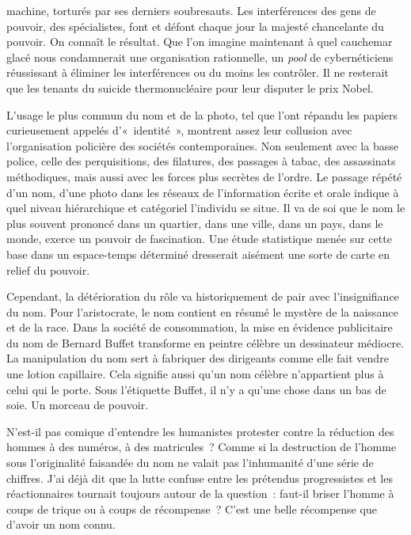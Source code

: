 \documentclass[french,twoside]{book} %
\newcommand{\astermono}{\medskip\centerline{\color{rubric}\large\selectfont{\syms ✻}}\medskip\par}%
\begin{document}
machine, torturés par ses derniers soubresauts. Les interférences des gens de pouvoir, des spécialistes, font et défont chaque jour la majesté chancelante du pouvoir. On connaît le résultat. Que l’on imagine maintenant à quel cauchemar glacé nous condamnerait une organisation rationnelle, un \emph{pool} de cybernéticiens réussissant à éliminer les interférences ou du moins les contrôler. Il ne resterait que les tenants du suicide thermonucléaire pour leur disputer le prix Nobel.\par

\astermono

\noindent L’usage le plus commun du nom et de la photo, tel que l’ont répandu les papiers curieusement appelés d’« identité », montrent assez leur collusion avec l’organisation policière des sociétés contemporaines. Non seulement avec la basse police, celle des perquisitions, des filatures, des passages à tabac, des assassinats méthodiques, mais aussi avec les forces plus secrètes de l’ordre. Le passage répété d’un nom, d’une photo dans les réseaux de l’information écrite et orale indique à quel niveau hiérarchique et catégoriel l’individu se situe. Il va de soi que le nom le plus souvent prononcé dans un quartier, dans une ville, dans un pays, dans le monde, exerce un pouvoir de fascination. Une étude statistique menée sur cette base dans un espace-temps déterminé dresserait aisément une sorte de carte en relief du pouvoir.\par
Cependant, la détérioration du rôle va historiquement de pair avec l’insignifiance du nom. Pour l’aristocrate, le nom contient en résumé le mystère de la naissance et de la race. Dans la société de consommation, la mise en évidence publicitaire du nom de Bernard Buffet transforme en peintre célèbre un dessinateur médiocre. La manipulation du nom sert à fabriquer des dirigeants comme elle fait vendre une lotion capillaire. Cela signifie aussi qu’un nom célèbre n’appartient plus à celui qui le porte. Sous l’étiquette Buffet, il n’y a qu’une chose dans un bas de soie. Un morceau de pouvoir.\par
N’est-il pas comique d’entendre les humanistes protester contre la réduction des hommes à des numéros, à des matricules ? Comme si la destruction de l’homme sous l’originalité faisandée du nom ne valait pas l’inhumanité d’une série de chiffres. J’ai déjà dit que la lutte confuse entre les prétendus progressistes et les réactionnaires tournait toujours autour de la question : faut-il briser l’homme à coups de trique ou à coups de récompense ? C’est une belle récompense que d’avoir un nom connu.\par
\end{document}

